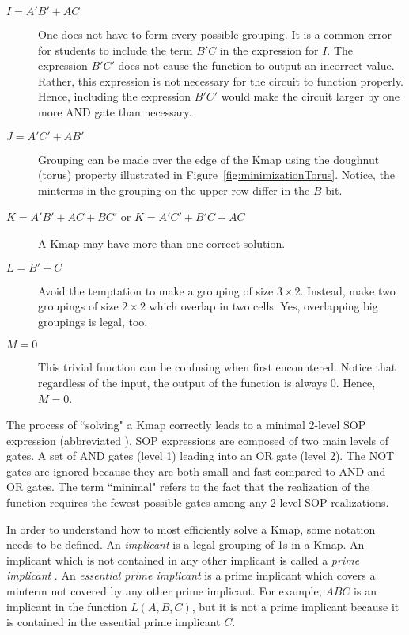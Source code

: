 \begin{changemargin}{1.5cm}{1.5cm}
\begin{description}
\item [$I=A'B'+AC$]
One does not have to form every possible grouping.  It is
a common error for students to include the term $B'C$ in the expression
for $I$.  The expression $B'C'$  does not cause the function to output
an incorrect value. Rather, this expression is not necessary for the
circuit to function properly.  Hence, including the expression $B'C'$ 
would make the circuit larger by one more AND gate than necessary.

\item [$J=A'C'+AB'$] 
Grouping can be made over the edge of the Kmap using the doughnut
 (torus) property illustrated in Figure~\ref{fig:minimizationTorus}.
Notice, the minterms in the grouping on the upper row 
differ in the $B$ bit.

\item [$K=A'B'+AC+BC'$ or $K=A'C'+B'C+AC$]
A Kmap may have more than one correct solution.

\item [$L=B'+C$]
Avoid the temptation to make a grouping of size $3 \times 2$.
Instead, make two groupings of size $2 \times 2$ which overlap 
in two cells.  Yes, overlapping big groupings is legal, too.



\item [$M=0$] 
This trivial function can be confusing when first encountered.
Notice that regardless of the input, the output of the function 
is always 0.  Hence, $M=0$.
\end{description}
\end{changemargin} 

The process of ``solving" a Kmap correctly leads to a minimal 2-level 
SOP expression (abbreviated \SOPmin).  SOP expressions are composed
of two main levels of gates. A set of AND gates (level 1) leading 
into an OR gate (level 2).  The NOT gates are ignored because they are 
both small and fast compared to AND and OR gates.  The term ``minimal"
refers to the fact that the realization of the function requires 
the fewest possible gates among any 2-level SOP realizations.  

In order to understand how to most efficiently solve a Kmap, some
notation needs to be defined.
An \textit{implicant}  is a legal grouping of 1s in 
a Kmap.  An implicant which is not contained in any other implicant 
is called a \textit{prime implicant} .  An 
\textit{essential prime implicant}  
is a prime implicant which covers a minterm not covered by any other 
prime implicant. For example, $ABC$ is an implicant in the function 
$L(A,B,C)$, but it is not a prime implicant because it is contained in 
the essential prime implicant $C$.

